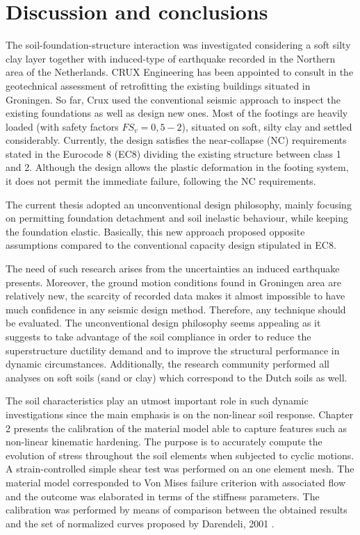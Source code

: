 \newpage
\chapter{Discussion and conclusions}
The soil-foundation-structure interaction was investigated considering a soft silty clay layer together with induced-type of earthquake recorded in the Northern area of the Netherlands. CRUX Engineering has been appointed to consult in the geotechnical assessment of retrofitting the existing buildings situated in Groningen. So far, Crux used the conventional seismic approach to inspect the existing foundations as well as design new ones. Most of the footings are heavily loaded (with safety factors $FS_v=0,5 -2$), situated on soft, silty clay and settled considerably. Currently, the design satisfies the near-collapse (NC) requirements stated in the Eurocode 8 (EC8) dividing the existing structure between class 1 and 2. Although the design allows the plastic deformation in the footing system, it does not permit the immediate failure, following the NC requirements.

  The current thesis adopted an unconventional design philosophy, mainly focusing on permitting foundation detachment and soil inelastic behaviour, while keeping the foundation elastic. Basically, this new approach proposed opposite assumptions compared to the conventional capacity design stipulated in EC8.

The need of such research arises from the uncertainties an induced earthquake presents. Moreover, the ground motion conditions found in Groningen area are relatively new, the scarcity of recorded data makes it almost impossible to have much confidence in any seismic design method. Therefore, any technique should be evaluated. The unconventional design philosophy seems appealing as it suggests to take advantage of the soil compliance in order to reduce the superstructure ductility demand and to improve the structural performance in dynamic circumstances. Additionally, the research community performed all analyses on soft soils (sand or clay) which correspond to the Dutch soils as well.

The soil characteristics play an utmost important role in such dynamic investigations since the main emphasis is on the non-linear soil response. Chapter 2 presents the calibration of the material model able to capture features such as non-linear kinematic hardening. The purpose is to accurately compute the evolution of stress throughout the soil elements when subjected to cyclic motions. A strain-controlled simple shear test was performed on an one element mesh. The material model corresponded to Von Mises failure criterion with associated flow and the outcome was elaborated in terms of the stiffness parameters. The calibration was performed by means of comparison between the obtained results and the set of normalized curves proposed by Darendeli, 2001 \cite{darendeli2001development}.

